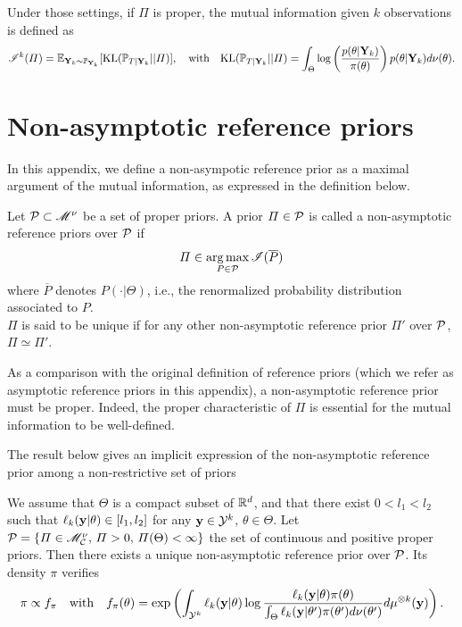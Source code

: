 Under those settings, if $\varPi$ is proper, the mutual information given $k$ observations is defined   as
    \begin{equation}
        \mathscr{I}^k(\varPi) = \mathbb{E}_{\mathbf{Y}_k\sim\mathbb{P}_{\mathbf{Y}_k}}[\text{KL}(\mathbb{P}_{T|\mathbf{Y}_k}||\varPi)], \quad\text{with} \quad \text{KL}(\mathbb{P}_{T|\mathbf{Y}_k}||\varPi) = \int_\Theta\log\left(\frac{p(\theta|\mathbf{Y}_k)}{\pi(\theta)}\right)p(\theta|\mathbf{Y}_k)d\nu(\theta).
    \end{equation}


\section{Non-asymptotic reference priors}\label{nonasympt:sec:nonasymptref}

In this appendix, we define a non-asympotic reference prior as a maximal argument of the mutual information, as expressed in the definition below.
\begin{defi}
    Let $\mathcal{P}\subset\mathscr{M}^\nu$ be a set of proper priors. A prior $\varPi\in\mathcal{P}$ is called a non-asymptotic reference priors over $\mathcal{P}$ if 
        \begin{equation}
            \varPi\in\operatorname*{arg\,max}_{P\in\mathcal{P}}\mathscr{I}(\overline{P})
        \end{equation}
    where $\overline{P}$ denotes $P(\cdot|\Theta)$, i.e., the renormalized probability distribution associated to $P$.\\
    $\varPi$ is said to be unique if for any other non-asymptotic reference prior $\varPi'$ over $\mathcal{P}$, $\varPi\simeq\varPi'$.
\end{defi}
As a comparison with the original definition of reference priors (which we refer as asymptotic reference priors in this appendix), a non-asymptotic reference prior must be proper.
Indeed, the proper characteristic of $\varPi$ is essential for the mutual information to be well-defined.




The result below gives an implicit expression of the non-asymptotic reference prior among a non-restrictive set of priors

\begin{thm}\label{nonasympt:thm:refnoconstr}
    We assume that $\Theta$ is a compact subset of $\mathbb{R}^d$, and that there exist $0<l_1<l_2$ such that $\ell_k(\mathbf{y}|\theta)\in[l_1,l_2]$ for any $\mathbf{y}\in\mathcal{Y}^k$, $\theta\in\Theta$. Let $\mathcal{P}=\{\varPi\in\mathscr{M}^\nu_{\mathcal{C}},\,\varPi>0,\,\varPi(\Theta)<\infty\}$ the set of continuous and positive proper priors. Then there exists a unique non-asymptotic reference prior over $\mathcal{P}$. Its density $\pi$ verifies
        \begin{equation}
            \pi\propto f_\pi\quad\text{with}\quad f_\pi(\theta) = \exp\left(\int_{\mathcal{Y}^k}\ell_k(\mathbf{y}|\theta)\log\frac{\ell_k(\mathbf{y}|\theta)\pi(\theta)}{\int_{\Theta}\ell_k(\mathbf{y}|\theta')\pi(\theta')d\nu(\theta')}d\mu^{\otimes k}(\mathbf{y})\right).
        \end{equation}
\end{thm}


